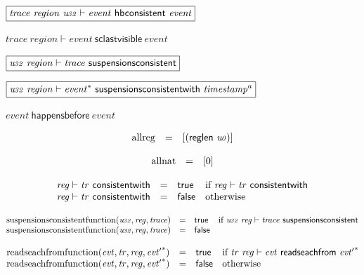 $\boxed{{\mathit{trace}}~{\mathit{region}}~{\mathit{u{\kern-0.1em\scriptstyle 32}}} \vdash {\mathit{event}}~\mathsf{hbconsistent}~{\mathit{event}}}$

$\boxed{{\mathit{trace}}~{\mathit{region}} \vdash {\mathit{event}}~\mathsf{sclastvisible}~{\mathit{event}}}$

$\boxed{{\mathit{u{\kern-0.1em\scriptstyle 32}}}~{\mathit{region}} \vdash {\mathit{trace}}~\mathsf{suspensionsconsistent}}$

$\boxed{{\mathit{u{\kern-0.1em\scriptstyle 32}}}~{\mathit{region}} \vdash {{\mathit{event}}^\ast}~\mathsf{suspensionsconsistentwith}~{{\mathit{timestamp}}^{a}}}$

$\boxed{{\mathit{event}}~\mathsf{happensbefore}~{\mathit{event}}}$

$$
\begin{array}[t]{@{}lcl@{}l@{}}
{\mathrm{allreg}} & = & {}[(\mathsf{reglen}~{\mathit{u{\kern-0.1em\scriptstyle 0}}})] \\
\end{array}
$$

$$
\begin{array}[t]{@{}lcl@{}l@{}}
{\mathrm{allnat}} & = & {}[0] \\
\end{array}
$$

$$
\begin{array}[t]{@{}lcl@{}l@{}}
{\mathit{reg}} \vdash {\mathit{tr}}~\mathsf{consistentwith} & = & \mathsf{true} & \quad \mbox{if}~ {\mathit{reg}} \vdash {\mathit{tr}}~\mathsf{consistentwith} \\
{\mathit{reg}} \vdash {\mathit{tr}}~\mathsf{consistentwith} & = & \mathsf{false} & \quad \mbox{otherwise} \\
\end{array}
$$

$$
\begin{array}[t]{@{}lcl@{}l@{}}
{\mathrm{suspensionsconsistentfunction}}({\mathit{u{\kern-0.1em\scriptstyle 32}}}, {\mathit{reg}}, {\mathit{trace}}) & = & \mathsf{true} & \quad \mbox{if}~ {\mathit{u{\kern-0.1em\scriptstyle 32}}}~{\mathit{reg}} \vdash {\mathit{trace}}~\mathsf{suspensionsconsistent} \\
{\mathrm{suspensionsconsistentfunction}}({\mathit{u{\kern-0.1em\scriptstyle 32}}}, {\mathit{reg}}, {\mathit{trace}}) & = & \mathsf{false} \\
\end{array}
$$

$$
\begin{array}[t]{@{}lcl@{}l@{}}
{\mathrm{readseachfromfunction}}({\mathit{evt}}, {\mathit{tr}}, {\mathit{reg}}, {{\mathit{evt}'}^\ast}) & = & \mathsf{true} & \quad \mbox{if}~ {\mathit{tr}}~{\mathit{reg}} \vdash {\mathit{evt}}~\mathsf{readseachfrom}~{{\mathit{evt}'}^\ast} \\
{\mathrm{readseachfromfunction}}({\mathit{evt}}, {\mathit{tr}}, {\mathit{reg}}, {{\mathit{evt}'}^\ast}) & = & \mathsf{false} & \quad \mbox{otherwise} \\
\end{array}
$$

